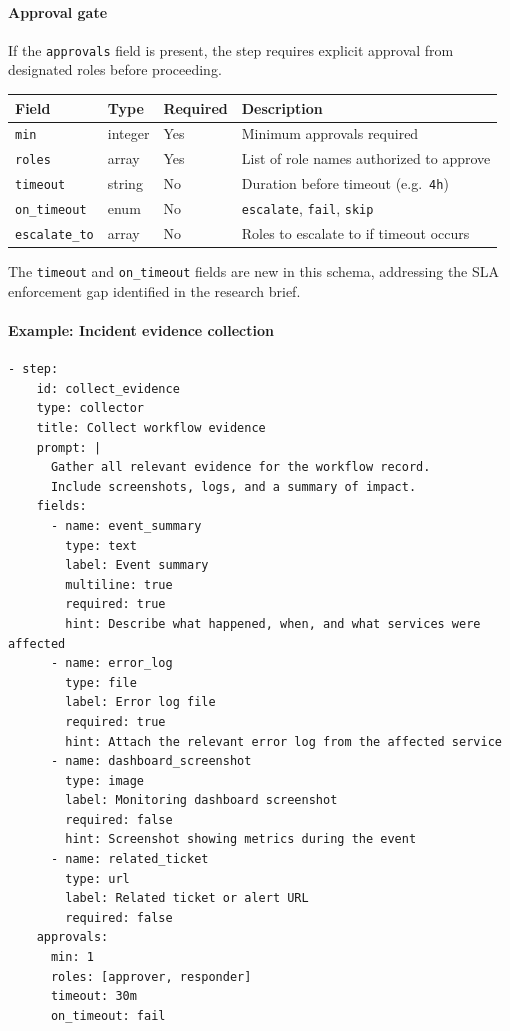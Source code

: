\paragraph{Approval gate}
\label{subsec:approval-gate}

If the \texttt{approvals} field is present, the step requires explicit approval
from designated roles before proceeding.

\begin{center}
\begin{tabular}{lllp{4cm}}
\hline
\textbf{Field} & \textbf{Type} & \textbf{Required} & \textbf{Description} \\
\hline
\texttt{min}          & integer & Yes & Minimum approvals required \\
\texttt{roles}        & array   & Yes & List of role names authorized to approve \\
\texttt{timeout}      & string  & No  & Duration before timeout (e.g.\ \texttt{4h}) \\
\texttt{on\_timeout}  & enum    & No  & \texttt{escalate}, \texttt{fail}, \texttt{skip} \\
\texttt{escalate\_to} & array   & No  & Roles to escalate to if timeout occurs \\
\hline
\end{tabular}
\end{center}

The \texttt{timeout} and \texttt{on\_timeout} fields are new in this schema, addressing
the SLA enforcement gap identified in the research brief.

\paragraph{Example: Incident evidence collection}

\begin{verbatim}
- step:
    id: collect_evidence
    type: collector
    title: Collect workflow evidence
    prompt: |
      Gather all relevant evidence for the workflow record.
      Include screenshots, logs, and a summary of impact.
    fields:
      - name: event_summary
        type: text
        label: Event summary
        multiline: true
        required: true
        hint: Describe what happened, when, and what services were affected
      - name: error_log
        type: file
        label: Error log file
        required: true
        hint: Attach the relevant error log from the affected service
      - name: dashboard_screenshot
        type: image
        label: Monitoring dashboard screenshot
        required: false
        hint: Screenshot showing metrics during the event
      - name: related_ticket
        type: url
        label: Related ticket or alert URL
        required: false
    approvals:
      min: 1
      roles: [approver, responder]
      timeout: 30m
      on_timeout: fail
\end{verbatim}

